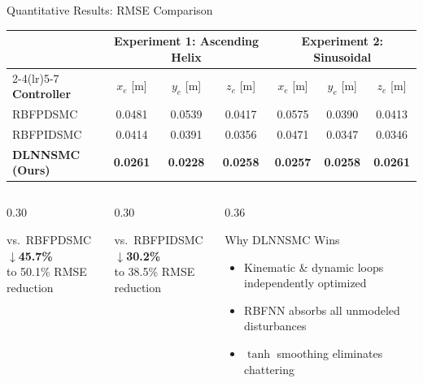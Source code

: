\documentclass[aspectratio=169,10pt]{beamer}
\begin{document}
\begin{frame}{Quantitative Results: RMSE Comparison}

\begin{center}
\begin{tabular}{lcccccc}
  \toprule
  & \multicolumn{3}{c}{\textbf{Experiment 1: Ascending Helix}}
  & \multicolumn{3}{c}{\textbf{Experiment 2: Sinusoidal}} \\
  \cmidrule(lr){2-4}\cmidrule(lr){5-7}
  \textbf{Controller}
    & $x_e$ [m] & $y_e$ [m] & $z_e$ [m]
    & $x_e$ [m] & $y_e$ [m] & $z_e$ [m] \\
  \midrule
  \rowcolor{red!12}
  RBFPDSMC
    & 0.0481 & 0.0539 & 0.0417
    & 0.0575 & 0.0390 & 0.0413 \\
  \rowcolor{yellow!15}
  RBFPIDSMC
    & 0.0414 & 0.0391 & 0.0356
    & 0.0471 & 0.0347 & 0.0346 \\
  \rowcolor{green!15}
  \textbf{DLNNSMC (Ours)}
    & \textbf{0.0261} & \textbf{0.0228} & \textbf{0.0258}
    & \textbf{0.0257} & \textbf{0.0258} & \textbf{0.0261} \\
  \bottomrule
\end{tabular}
\end{center}

\vspace{10pt}
\begin{columns}[T]
\begin{column}{0.30\textwidth}
  \begin{exampleblock}{\centering vs.\ RBFPDSMC}
    \centering
    {\Large\bfseries\color{okgreen}$\downarrow$45.7\%}\\
    {\small to 50.1\% RMSE reduction}
  \end{exampleblock}
\end{column}
\begin{column}{0.30\textwidth}
  \begin{exampleblock}{\centering vs.\ RBFPIDSMC}
    \centering
    {\Large\bfseries\color{okgreen}$\downarrow$30.2\%}\\
    {\small to 38.5\% RMSE reduction}
  \end{exampleblock}
\end{column}
\begin{column}{0.36\textwidth}
  \begin{block}{Why DLNNSMC Wins}
    \begin{itemize}\small
      \item Kinematic \& dynamic loops independently optimized
      \item RBFNN absorbs all unmodeled disturbances
      \item $\tanh$ smoothing eliminates chattering
    \end{itemize}
  \end{block}
\end{column}
\end{columns}
\end{frame}
\end{document}
